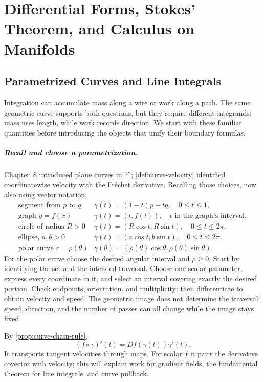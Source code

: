 \chapter{Differential Forms, Stokes' Theorem, and Calculus on Manifolds}
\label{ch:forms-stokes}

\section{Parametrized Curves and Line Integrals}
Integration can accumulate mass along a wire or work along a path. The same
geometric curve supports both questions, but they require different integrands:
mass uses length, while work records direction. We start with these familiar
quantities before introducing the objects that unify their boundary formulas.

\paragraph{Recall and choose a parametrization.}
Chapter~8 introduced plane curves in ``'';
\cref{def:curve-velocity} identified coordinatewise velocity with the
Fr\'echet derivative. Recalling those choices, now also using vector notation,
\[
\begin{array}{ll}
\text{segment from }p\text{ to }q & \gamma(t)=(1-t)p+tq,\quad 0\leq t\leq1,\\
\text{graph }y=f(x) & \gamma(t)=(t,f(t)),\quad t\text{ in the graph's interval},\\
\text{circle of radius }R>0 & \gamma(t)=(R\cos t,R\sin t),\quad0\leq t\leq2\pi,\\
\text{ellipse, }a,b>0 & \gamma(t)=(a\cos t,b\sin t),\quad0\leq t\leq2\pi,\\
\text{polar curve }r=\rho(\theta) &
\gamma(\theta)=(\rho(\theta)\cos\theta,\rho(\theta)\sin\theta).
\end{array}
\]
For the polar curve choose the desired angular interval and $\rho\geq0$.
Start by identifying the set and the intended traversal. Choose one scalar
parameter, express every coordinate in it, and select an interval covering
exactly the desired portion. Check endpoints, orientation, and multiplicity;
then differentiate to obtain velocity and speed. The geometric image does
not determine the traversal: speed, direction, and the number of passes
can all change while the image stays fixed.

By \cref{prop:curve-chain-rule},
\[
(f\circ\gamma)'(t)=Df(\gamma(t))\gamma'(t).
\]
It transports tangent velocities through maps. For scalar $f$ it pairs the
derivative covector with velocity; this will explain work for gradient
fields, the fundamental theorem for line integrals, and curve pullback.

